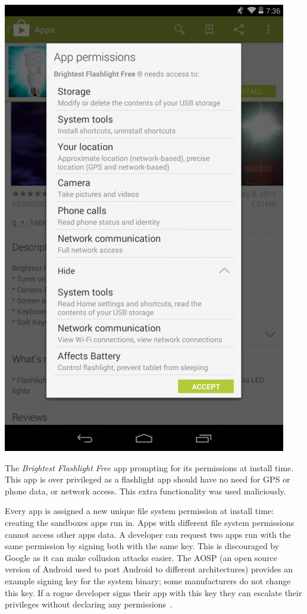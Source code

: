 \documentclass[a4paper]{article}
\begin{document}
\begin{marginfigure}
  \centering
  \includegraphics[width=\smallmarginlength]{img/brightestflashlight.png}
  \caption{The \emph{Brightest Flashlight Free} app prompting for its permissions
    at install time. This app is over privileged as a flashlight app should have
    no need for GPS or phone data, or network access.  This extra functionality
  was used maliciously.}
\label{img:brightestflashlight}
\end{marginfigure}

Every app is assigned a new unique file system permission at install time:
creating the sandboxes apps run in.  Apps with different file system permissions
cannot access other apps data.  A developer can request two apps run with the
same permission by signing both with the same key.  This is discouraged by
Google as it can make collusion attacks easier.  The \ac{AOSP} (an open source
version of Android used to port Android to different architectures) provides an
example signing key for the system binary; some manufacturers do not change this
key.  If a rogue developer signs their app with this key they can escalate their
privileges without declaring any permissions~\cite{Zheng:vb}.
\end{document}
